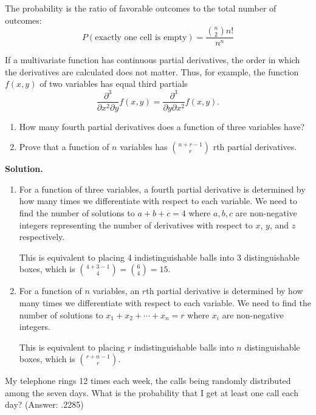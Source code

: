 The probability is the ratio of favorable outcomes to the total number of outcomes:
\[ P(\text{exactly one cell is empty}) = \frac{\binom{n}{2} n!}{n^n} \]

\begin{problembox}
If a multivariate function has continuous partial derivatives, the order in which the derivatives are calculated does not matter. Thus, for example, the function $f(x,y)$ of two variables has equal third partials
\[ \frac{\partial^{3}}{\partial x^{2}\partial y}f(x,y)=\frac{\partial^{3}}{\partial y\partial x^{2}}f(x,y). \]
\begin{enumerate}[label=(\alph*)]
    \item How many fourth partial derivatives does a function of three variables have?
    \item Prove that a function of $n$ variables has $\binom{n+r-1}{r}$ rth partial derivatives.
\end{enumerate}
\end{problembox}

\noindent\textbf{Solution.}
\begin{enumerate}[label=(\alph*)]
    \item For a function of three variables, a fourth partial derivative is determined by how many times we differentiate with respect to each variable. We need to find the number of solutions to $a + b + c = 4$ where $a, b, c$ are non-negative integers representing the number of derivatives with respect to $x$, $y$, and $z$ respectively.
    
    This is equivalent to placing 4 indistinguishable balls into 3 distinguishable boxes, which is $\binom{4+3-1}{4} = \binom{6}{4} = 15$.
    
    \item For a function of $n$ variables, an $r$th partial derivative is determined by how many times we differentiate with respect to each variable. We need to find the number of solutions to $x_1 + x_2 + \cdots + x_n = r$ where $x_i$ are non-negative integers.
    
    This is equivalent to placing $r$ indistinguishable balls into $n$ distinguishable boxes, which is $\binom{r+n-1}{r}$.
\end{enumerate}


\begin{problembox}
My telephone rings 12 times each week, the calls being randomly distributed among the seven days. What is the probability that I get at least one call each day?
(Answer: .2285)
\end{problembox}

